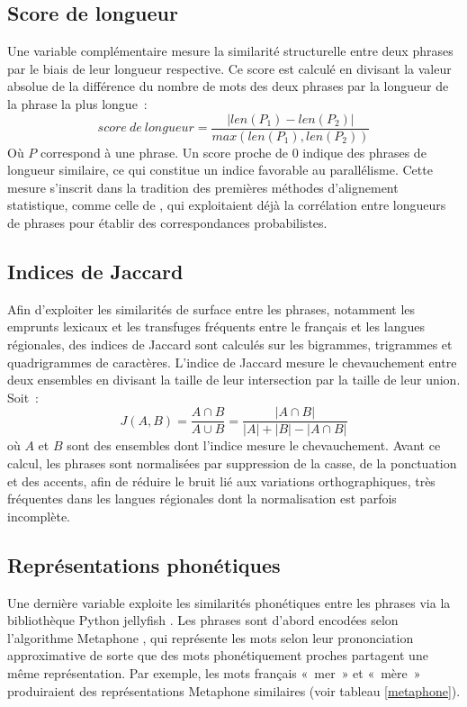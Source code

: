 \subsection{Score de longueur}

Une variable complémentaire mesure la similarité structurelle entre deux phrases par le biais de leur
longueur respective. Ce score est calculé en divisant la valeur absolue de la différence du nombre de mots
des deux phrases par la longueur de la phrase la plus longue~:
\[ score\ de\ longueur = \frac{\left| len(P_{1})-len(P_{2}) \right|}{max(len(P_{1}),len(P_{2}))} \]
Où $P$ correspond à une phrase.
Un score proche de 0 indique des phrases de longueur similaire, ce qui constitue un indice favorable au
parallélisme. Cette mesure s'inscrit dans la tradition des premières méthodes d'alignement statistique,
comme celle de \citet{gale_1991}, qui exploitaient déjà la corrélation entre longueurs de phrases pour
établir des correspondances probabilistes.

\subsection{Indices de Jaccard} \label{jaccard_idx}

Afin d'exploiter les similarités de surface entre les phrases, notamment les emprunts lexicaux et les
transfuges fréquents entre le français et les langues régionales, des indices de Jaccard
sont calculés sur les bigrammes, trigrammes et quadrigrammes de caractères. L'indice de Jaccard mesure le
chevauchement entre deux ensembles en divisant la taille de leur intersection par la taille de leur union.
Soit~:
\[ J(A,B)=\frac{A \cap B}{A \cup B}=\frac{|A \cap B|}{|A| + |B| - |A \cap  B|} \]
où $A$ et $B$ sont des ensembles dont l'indice mesure le chevauchement.
Avant ce calcul, les phrases sont normalisées par suppression de la casse, de la ponctuation et des accents,
afin de réduire le bruit lié aux variations orthographiques, très fréquentes dans les langues
régionales dont la normalisation est parfois incomplète.

\subsection{Représentations phonétiques}

Une dernière variable exploite les similarités phonétiques entre les phrases via la bibliothèque Python
jellyfish \citep{turk_2013}. Les phrases sont d'abord encodées selon l'algorithme Metaphone \citep{philips_1990},
qui représente les mots selon leur prononciation approximative de sorte que des mots phonétiquement proches
partagent une même représentation. Par exemple, les mots français «~mer~» et «~mère~» produiraient des
représentations Metaphone \citep{philips_1990} similaires (voir tableau \ref{metaphone}). 

